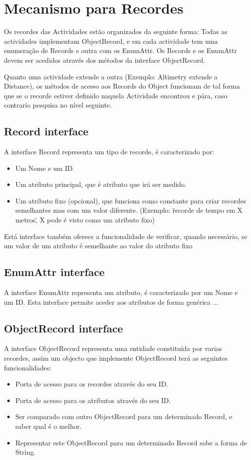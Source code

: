 \section{Mecanismo para Recordes}
Os recordes das Actividades estão organizados da seguinte forma: Todas as actividades implementam ObjectRecord, e em cada actividade tem uma enumeração de Records e outra com os EnumAttr.
Os Records e os EnumAttr devem ser acedidos através dos métodos da interface ObjectRecord.

Quanto uma actividade extende a outra (Exemplo: Altimetry extende a Distance), os métodos de acesso aos Records do Object funcionam de tal forma que se o recorde estiver definido naquela Actividade encontrou e pára, caso contrario pesquisa no nível seguinte.

\subsection{Record interface}
\label{sec:interface}
A interface Record representa um tipo de recorde, é caracterizado por:
\begin{itemize}
 \item Um Nome e um ID. 
 \item Um atributo principal, que é atributo que irá ser medido.
 \item Um atributo fixo (opcional), que funciona como constante para criar recordes semelhantes mas com um valor diferente. (Exemplo: \"recorde de tempo em X metros\", X pode é visto como um atributo fixo)
\end{itemize}
Está interface também oferece a funcionalidade de verificar, quando necessário, se um valor de um atributo é semelhante ao valor do atributo fixo

\subsection{EnumAttr interface}
\label{sec:interface}
A interface EnumAttr representa um atributo, é caracterizado por um Nome e um ID. Esta interface permite aceder aos atributos de forma genérica ...

\subsection{ObjectRecord interface}
\label{sec:interface}
A interface ObjectRecord representa uma entidade constituída por varias recordes, assim um objecto que implemente ObjectRecord terá as seguintes funcionalidades:

\begin{itemize}
 \item Porta de acesso para os recordes através do seu ID.
 \item Porta de acesso para os atributos através do seu ID.
 \item Ser comparado com outro ObjectRecord para um determinado Record, e saber qual é o melhor.
 \item Representar este ObjectRecord para um determinado Record sobe a forma de String.
\end{itemize}